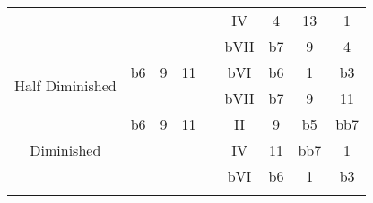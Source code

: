 \documentclass[10pt,a4paper]{article}
\begin{document}
\begin{table}[]
\begin{tabular}{ccccccccc}
\multicolumn{1}{|c|}{}                                 & \multicolumn{1}{c|}{}   & \multicolumn{1}{c|}{}     & \multicolumn{1}{c|}{}   & \multicolumn{1}{c|}{}    & \multicolumn{1}{c|}{IV}                    & \multicolumn{1}{c|}{4}   & \multicolumn{1}{c|}{13}   & \multicolumn{1}{c|}{1}    \\ \cline{2-9} 
\multicolumn{1}{|c|}{}                                 & \multicolumn{1}{c|}{}   & \multicolumn{1}{c|}{}     & \multicolumn{1}{c|}{}   & \multicolumn{1}{c|}{}    & \multicolumn{1}{c|}{bVII}                  & \multicolumn{1}{c|}{b7}  & \multicolumn{1}{c|}{9}    & \multicolumn{1}{c|}{4}    \\ \hline
\multicolumn{1}{|c|}{\multirow{2}{*}{Half Diminished}} & \multicolumn{1}{c|}{b6} & \multicolumn{1}{c|}{9}    & \multicolumn{1}{c|}{11} & \multicolumn{1}{c|}{}    & \multicolumn{1}{c|}{bVI}                   & \multicolumn{1}{c|}{b6}  & \multicolumn{1}{c|}{1}    & \multicolumn{1}{c|}{b3}   \\ \cline{2-9} 
\multicolumn{1}{|c|}{}                                 & \multicolumn{1}{c|}{}   & \multicolumn{1}{c|}{}     & \multicolumn{1}{c|}{}   & \multicolumn{1}{c|}{}    & \multicolumn{1}{c|}{bVII}                  & \multicolumn{1}{c|}{b7}  & \multicolumn{1}{c|}{9}    & \multicolumn{1}{c|}{11}   \\ \hline
\multicolumn{1}{|c|}{\multirow{3}{*}{Diminished}}      & \multicolumn{1}{c|}{b6} & \multicolumn{1}{c|}{9}    & \multicolumn{1}{c|}{11} & \multicolumn{1}{c|}{}    & \multicolumn{1}{c|}{II}                    & \multicolumn{1}{c|}{9}   & \multicolumn{1}{c|}{b5}   & \multicolumn{1}{c|}{bb7}  \\ \cline{2-9} 
\multicolumn{1}{|c|}{}                                 & \multicolumn{1}{c|}{}   & \multicolumn{1}{c|}{}     & \multicolumn{1}{c|}{}   & \multicolumn{1}{c|}{}    & \multicolumn{1}{c|}{IV}                    & \multicolumn{1}{c|}{11}  & \multicolumn{1}{c|}{bb7}  & \multicolumn{1}{c|}{1}    \\ \cline{2-9} 
\multicolumn{1}{|c|}{}                                 & \multicolumn{1}{c|}{}   & \multicolumn{1}{c|}{}     & \multicolumn{1}{c|}{}   & \multicolumn{1}{c|}{}    & \multicolumn{1}{c|}{bVI}                   & \multicolumn{1}{c|}{b6}  & \multicolumn{1}{c|}{1}    & \multicolumn{1}{c|}{b3}   \\ \hline
                                                       &                         &                           &                         &                          &                                            &                          &                           &                          
\end{tabular}
\end{table}
\end{document}
